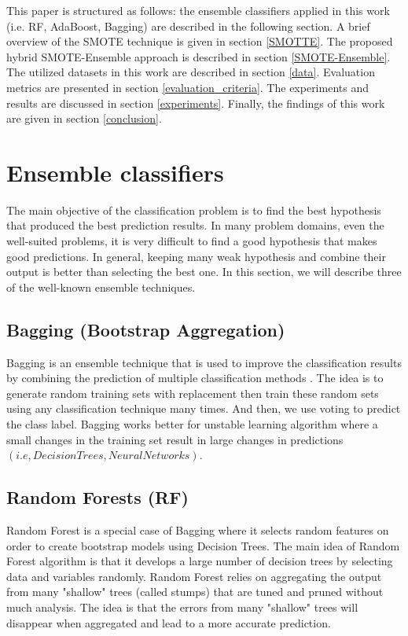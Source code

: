 \documentclass[runningheads,a4paper]{llncs}
\begin{document}

This paper is structured as follows: the ensemble classifiers applied in this work (i.e. RF, AdaBoost, Bagging) are described in the following section. A brief overview of the SMOTE technique is given in section \ref{SMOTTE}. The proposed hybrid SMOTE-Ensemble approach is described in section \ref{SMOTE-Ensemble}. The utilized datasets in this work are described in section \ref{data}. Evaluation metrics are presented in section \ref{evaluation_criteria}. The experiments and results are discussed in section \ref{experiments}. Finally, the findings of this work are given in section \ref{conclusion}.






\section{Ensemble classifiers}
\label{ensembles}
The main objective of the classification problem is to find the best hypothesis that produced the best prediction results. In many problem domains, even the well-suited problems, it is very difficult to find a good hypothesis that makes good predictions. In general, keeping many weak hypothesis and combine their output is better than selecting the best one.
In this section, we will describe three of the well-known ensemble techniques.

\subsection{Bagging (Bootstrap Aggregation)}
Bagging is an ensemble technique that is used to improve the classification results by combining the prediction of multiple classification methods \cite{Breiman1996}. The idea is to generate random training sets with replacement then train these random sets using any classification technique many times. And then, we use voting to predict the class label.
Bagging works better for unstable  learning algorithm where a small changes in the training set result in large changes in predictions $(i.e, Decision Trees,  Neural Networks)$.

\subsection{Random Forests (RF)}
Random Forest \cite{breiman2001random} is a special case of Bagging where it selects  random features on order to create bootstrap models using Decision Trees. The main idea of Random Forest algorithm is that it develops a large number of decision trees by selecting data and variables randomly.
Random Forest relies on aggregating the output from many "shallow" trees (called stumps) that are tuned and pruned without much analysis. The idea is that the errors from many "shallow" trees will disappear when aggregated and lead to a more accurate prediction.
\end{document}
